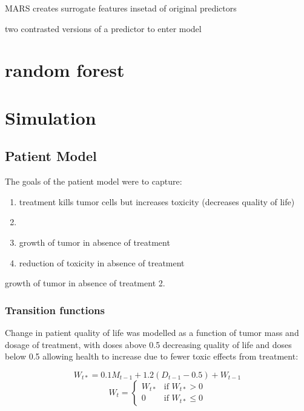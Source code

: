 \documentclass[12pt]{article}
\begin{document}
MARS creates surrogate features insetad of original predictors

two contrasted versions of a predictor to enter model


\section{random forest} %
\label{sec:random_forest}


\section{Simulation}

\subsection{Patient Model} %
\label{sub:vpm}



The goals of the patient model were to capture:

\begin{enumerate}
  \item treatment kills tumor cells but increases toxicity (decreases quality of life)
  \item 
  \item growth of tumor in absence of treatment
  \item reduction of toxicity in absence of treatment
\end{enumerate}growth of tumor in absence of treatment 2. 

\subsubsection{Transition functions} %
\label{ssub:transition_functions}



Change in patient quality of life was modelled as a function of tumor mass and dosage of treatment, with doses above 0.5 decreasing quality of life and doses below 0.5 allowing health to increase due to fewer toxic effects from treatment:

\[
W_{t*} = 0.1 M_{t-1} + 1.2 (D_{t-1} - 0.5) + W_{t - 1}
\]
\[
W_{t} = \begin{cases}
  W_{t*} &\text{if } W_{t*} > 0 \\
  0 &\text{if } W_{t*} \leq 0
\end{cases}
\]
\end{document}
